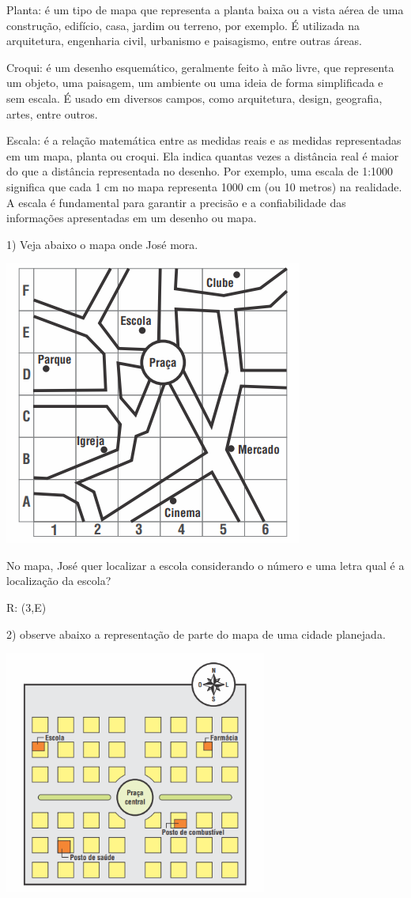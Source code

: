 Planta: é um tipo de mapa que representa a planta baixa ou a vista aérea
de uma construção, edifício, casa, jardim ou terreno, por exemplo. É
utilizada na arquitetura, engenharia civil, urbanismo e paisagismo,
entre outras áreas.

Croqui: é um desenho esquemático, geralmente feito à mão livre, que
representa um objeto, uma paisagem, um ambiente ou uma ideia de forma
simplificada e sem escala. É usado em diversos campos, como arquitetura,
design, geografia, artes, entre outros.

Escala: é a relação matemática entre as medidas reais e as medidas
representadas em um mapa, planta ou croqui. Ela indica quantas vezes a
distância real é maior do que a distância representada no desenho. Por
exemplo, uma escala de 1:1000 significa que cada 1 cm no mapa representa
1000 cm (ou 10 metros) na realidade. A escala é fundamental para
garantir a precisão e a confiabilidade das informações apresentadas em
um desenho ou mapa.


1) Veja abaixo o mapa onde José mora.

\includegraphics[width=3.86042in,height=3.68611in]{./imgSAEB_6_MAT/media/image64.png}

No mapa, José quer localizar a escola considerando o número e uma letra
qual é a localização da escola?

R: (3,E)

2) observe abaixo a representação de parte do mapa de uma cidade
planejada.

\includegraphics[width=3.39535in,height=3.14326in]{./imgSAEB_6_MAT/media/image65.png}

